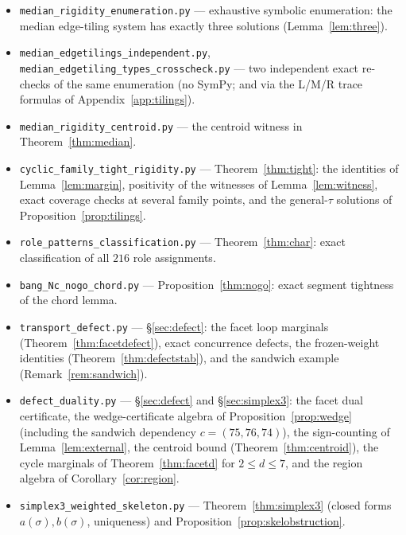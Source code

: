 \documentclass[11pt,reqno]{amsart}
\theoremstyle{plain}
\theoremstyle{definition}
\theoremstyle{remark}
\begin{document}
\begin{itemize}
\item\texttt{median\_rigidity\_enumeration.py} --- exhaustive symbolic
enumeration: the median edge-tiling system has exactly three solutions
(Lemma~\ref{lem:three}).
\item\texttt{median\_edgetilings\_independent.py},
\texttt{median\_edgetiling\_types\_crosscheck.py} --- two independent exact
re-checks of the same enumeration (no SymPy; and via the L/M/R trace
formulas of Appendix~\ref{app:tilings}).
\item\texttt{median\_rigidity\_centroid.py} --- the centroid witness in
Theorem~\ref{thm:median}.
\item\texttt{cyclic\_family\_tight\_rigidity.py} --- Theorem~\ref{thm:tight}:
the identities of Lemma~\ref{lem:margin}, positivity of the witnesses of
Lemma~\ref{lem:witness}, exact coverage checks at several family points, and
the general-$\tau$ solutions of Proposition~\ref{prop:tilings}.
\item\texttt{role\_patterns\_classification.py} --- Theorem~\ref{thm:char}:
exact classification of all $216$ role assignments.
\item\texttt{bang\_Nc\_nogo\_chord.py} --- Proposition~\ref{thm:nogo}: exact
segment tightness of the chord lemma.
\item\texttt{transport\_defect.py} --- \S\ref{sec:defect}: the facet loop
marginals (Theorem~\ref{thm:facetdefect}), exact concurrence defects, the
frozen-weight identities (Theorem~\ref{thm:defectstab}), and the sandwich
example (Remark~\ref{rem:sandwich}).
\item\texttt{defect\_duality.py} --- \S\ref{sec:defect} and
\S\ref{sec:simplex3}: the facet dual certificate, the wedge-certificate
algebra of Proposition~\ref{prop:wedge} (including the sandwich dependency
$c=(75,76,74)$), the sign-counting of Lemma~\ref{lem:external}, the centroid
bound (Theorem~\ref{thm:centroid}), the cycle marginals of
Theorem~\ref{thm:facetd} for $2\le d\le7$, and the region algebra of
Corollary~\ref{cor:region}.
\item\texttt{simplex3\_weighted\_skeleton.py} --- Theorem~\ref{thm:simplex3}
(closed forms $a(\sigma),b(\sigma)$, uniqueness) and
Proposition~\ref{prop:skelobstruction}.
\end{itemize}
\end{document}
